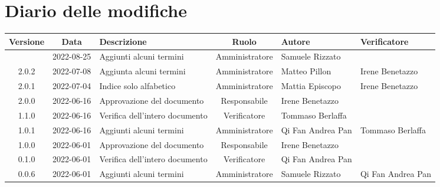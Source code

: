 \section*{Diario delle modifiche}
	\begin{center}
	\renewcommand{\arraystretch}{1.8} %
	\begin{longtable}{ |c|c|p{8em}|c|m{5em}|m{6em}| }
	\hline %
	\textbf{Versione} & \textbf{Data} & \textbf{Descrizione} &  \textbf{Ruolo} &  \textbf{Autore} & \textbf{Verificatore}\\ %
    \hline
     & 2022-08-25 & Aggiunti alcuni termini & Amministratore & Samuele \newline Rizzato & \\
    \hline
    2.0.2 & 2022-07-08 & Aggiunta alcuni termini & Amministratore & Matteo \newline Pillon & Irene \newline Benetazzo \\
	\hline
	2.0.1 & 2022-07-04 & Indice solo alfabetico & Amministratore & Mattia \newline Episcopo & Irene Benetazzo \\
	\hline
    2.0.0 & 2022-06-16 & Approvazione del documento & Responsabile & Irene \newline Benetazzo & \\
	\hline
	1.1.0 & 2022-06-16 & Verifica dell'intero documento & Verificatore & Tommaso \newline Berlaffa & \\
	\hline
	1.0.1 & 2022-06-16 & Aggiunti alcuni termini & Amministratore & Qi Fan \newline Andrea Pan &  Tommaso \newline Berlaffa \\
	\hline 
	1.0.0 & 2022-06-01 & Approvazione del documento & Responsabile & Irene \newline Benetazzo & \\
	\hline
	0.1.0 & 2022-06-01 & Verifica dell'intero documento & Verificatore & Qi Fan \newline Andrea Pan & \\
	\hline
	0.0.6 & 2022-06-01 & Aggiunti alcuni termini & Amministratore & Samuele \newline Rizzato &Qi Fan \newline Andrea Pan \\

\end{longtable}
\end{center}
